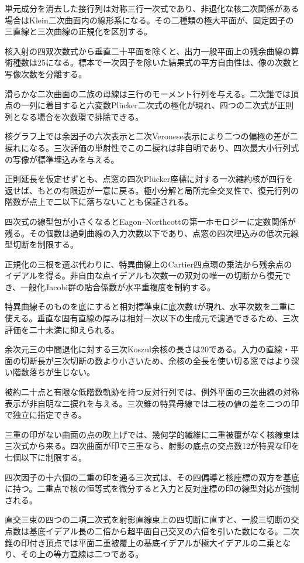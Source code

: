 \documentclass[11pt,a4paper]{ltjsarticle}
\begin{document}
単元成分を消去した接行列は対称三行一次式であり、非退化な核二次関係がある場合はKlein二次曲面内の線形系になる。その二種類の極大平面が、固定因子の三直線と三次曲線の正規化を区別する。

核入射の四双次数式から垂直二十平面を除くと、出力一般平面上の残余曲線の算術種数は25になる。標本で一次因子を除いた結果式の平方自由性は、像の次数と写像次数を分離する。

滑らかな二次曲面の二族の母線は三行のモーメント行列を与える。二次錐では頂点の一列に着目すると六変数Plücker二次式の極化が現れ、四つの二次式が正則列となる場合を次数環で排除できる。

核グラフ上では余因子の六次表示と二次Veronese表示により二つの偏極の差が二捩れになる。三次評価の単射性でこの二捩れは非自明であり、四次最大小行列式の写像が標準埋込みを与える。

正則延長を仮定せずとも、点窓の四次Plücker座標に対する一次縮約核が四行を返せば、もとの有限辺が一意に戻る。極小分解と局所完全交叉性で、復元行列の階数が点上で二以下に落ちないことも保証される。

四次式の線型包が小さくなるとEagon--Northcottの第一ホモロジーに定数関係が残る。その個数は過剰曲線の入力次数以下であり、点窓の四次埋込みの低次元線型切断を制限する。

正規化の三根を選ぶ代わりに、特異曲線上のCartier四点環の乗法から残余点のイデアルを得る。非自由な点イデアルも次数一の双対の唯一の切断から復元でき、一般化Jacobi群の貼合係数が水平重複度を制約する。

特異曲線そのものを底にすると相対標準束に底次数4が現れ、水平次数を二重に使える。垂直な固有直線の厚みは相対一次以下の生成元で濾過できるため、三次評価を二十未満に抑えられる。

余次元三の中間退化に対する三次Koszul余核の長さは20である。入力の直線・平面の切断長が三次切断の数より小さいため、余核の全長を使い切る窓ではより深い階数落ちが生じない。

被約二十点と有限な低階数軌跡を持つ反対行列では、例外平面の三次曲線の対称表示が非自明な二捩れを与える。三次錐の特異母線では二枝の値の差を二つの印で独立に指定できる。

三重の印がない曲面の点の吹上げでは、幾何学的繊維に二重被覆がなく核線束は三次式から来る。四次曲面が印で三重なら、射影の底点の交点数12が特異な印を七個以下に制限する。

四次因子の十六個の二重の印を通る三次式は、その四偏導と核座標の双方を基底に持つ。二重点で核の恒等式を微分すると入力と反対座標の印の線型対応が強制される。

直交三束の四つの二項二次式を射影直線束上の四切断に直すと、一般三切断の交点数は基底イデアル長の二倍から超平面自己交叉の六倍を引いた数になる。二次錐の印付き頂点では平面二重被覆上の基底イデアルが極大イデアルの二乗となり、その上の等方直線は二つである。
\end{document}
